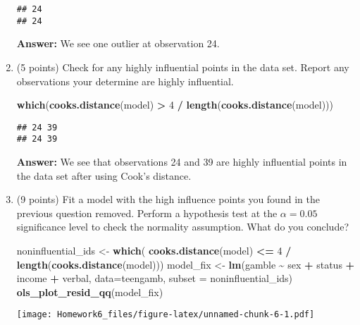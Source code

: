 \documentclass[
]{article}
\newenvironment{Shaded}{\begin{snugshade}}{\end{snugshade}}
\newcommand{\AttributeTok}[1]{\textcolor[rgb]{0.13,0.29,0.53}{#1}}
\newcommand{\DecValTok}[1]{\textcolor[rgb]{0.00,0.00,0.81}{#1}}
\newcommand{\FunctionTok}[1]{\textcolor[rgb]{0.13,0.29,0.53}{\textbf{#1}}}
\newcommand{\NormalTok}[1]{#1}
\newcommand{\OtherTok}[1]{\textcolor[rgb]{0.56,0.35,0.01}{#1}}
\newcommand{\SpecialCharTok}[1]{\textcolor[rgb]{0.81,0.36,0.00}{\textbf{#1}}}
\begin{document}
\begin{enumerate}
\begin{verbatim}
## 24 
## 24
\end{verbatim}

  \textbf{Answer:} We see one outlier at observation 24.
\item
  (5 points) Check for any highly influential points in the data set.
  Report any observations your determine are highly influential.

\begin{Shaded}
\begin{Highlighting}[]
\FunctionTok{which}\NormalTok{(}\FunctionTok{cooks.distance}\NormalTok{(model) }\SpecialCharTok{\textgreater{}} \DecValTok{4} \SpecialCharTok{/} \FunctionTok{length}\NormalTok{(}\FunctionTok{cooks.distance}\NormalTok{(model)))}
\end{Highlighting}
\end{Shaded}

\begin{verbatim}
## 24 39 
## 24 39
\end{verbatim}

  \textbf{Answer:} We see that observations 24 and 39 are highly
  influential points in the data set after using Cook's distance.
\item
  (9 points) Fit a model with the high influence points you found in the
  previous question removed. Perform a hypothesis test at the
  \(\alpha = 0.05\) significance level to check the normality
  assumption. What do you conclude?

\begin{Shaded}
\begin{Highlighting}[]
\NormalTok{noninfluential\_ids }\OtherTok{\textless{}{-}} \FunctionTok{which}\NormalTok{(}
    \FunctionTok{cooks.distance}\NormalTok{(model) }\SpecialCharTok{\textless{}=} \DecValTok{4} \SpecialCharTok{/} \FunctionTok{length}\NormalTok{(}\FunctionTok{cooks.distance}\NormalTok{(model)))}
\NormalTok{model\_fix }\OtherTok{\textless{}{-}} \FunctionTok{lm}\NormalTok{(gamble }\SpecialCharTok{\textasciitilde{}}\NormalTok{ sex }\SpecialCharTok{+}\NormalTok{ status }\SpecialCharTok{+}\NormalTok{ income }\SpecialCharTok{+}\NormalTok{ verbal, }
               \AttributeTok{data=}\NormalTok{teengamb,}
               \AttributeTok{subset =}\NormalTok{ noninfluential\_ids)}
\FunctionTok{ols\_plot\_resid\_qq}\NormalTok{(model\_fix)}
\end{Highlighting}
\end{Shaded}

  \texttt{[image: Homework6\_files/figure-latex/unnamed-chunk-6-1.pdf]}


\end{enumerate}
\end{document}
